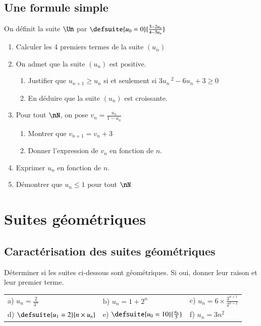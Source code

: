 \documentclass[oneside,12pt]{article}          %
\begin{document}
\subsection{Une formule simple}
On définit la suite $\Un$ par $\defsuite{u_0=0}{\frac{3-2u_n}{4-3u_n}}$
\begin{enumerate}
	\item Calculer les 4 premiers termes de la suite $(u_n)$
	\item On admet que la suite $(u_n)$ est positive.
	\begin{enumerate}
		\item Justifier que $u_{n+1}\geq u_n$ si et seulement si $3u_n\,^2-6u_n+3\geq0$
		\item En déduire que la suite $(u_n)$ est croissante.
	\end{enumerate}
	\item Pour tout $\nN$, on pose $v_n=\frac{u_n}{1-u_n}$
	\begin{enumerate}
		\item Montrer que $v_{n+1}=v_n+3$
		\item Donner l'expression de $v_n$ en fonction de $n$.
	\end{enumerate}
	\item Exprimer $u_n$ en fonction de $n$.
	\item Démontrer que $u_n\leq1$ pour tout $\nN$
\end{enumerate}



\section{Suites géométriques}

\subsection{Caractérisation des suites géométriques}
Déterminer si les suites ci-dessous sont géométriques. Si oui, donner leur raison et leur premier terme.\\
\begin{tabular}{p{} p{} p{}}
	a) $u_n=\frac{2}{3^{n}}$ & b) $u_n=1+2^{n}$ & c) $u_n=6\times\frac{3^{n+1}}{2^{n+2}}$ \\
	d) $ \defsuite{u_{1}=2}{n\times u_n}$ & e) $\defsuite{u_{0}=10}{\frac{u_n}{5}}$ & f) $u_n=3n^{2}$
\end{tabular}
\end{document}
